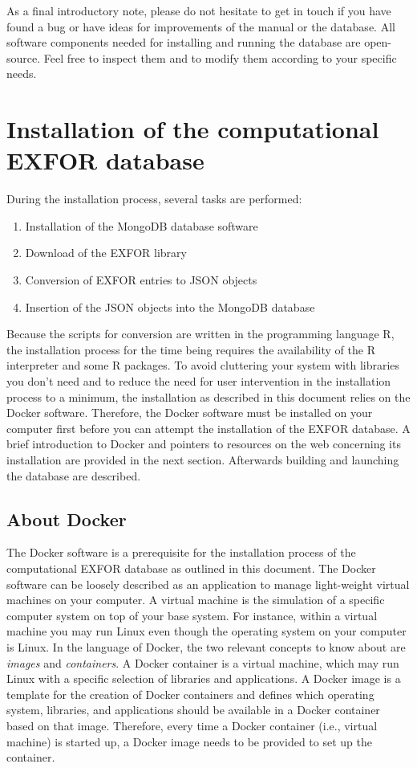 \documentclass[12pt,a4paper]{scrartcl}
\begin{document}
As a final introductory note, please do not hesitate to get in touch if you have found a bug or have ideas for improvements of the manual or the database.
All software components needed for installing and running the database are open-source.
Feel free to inspect them and to modify them according to your specific needs.

 \section{Installation of the computational EXFOR database}
 \label{sec:install_EXFOR}

 During the installation process, several tasks are performed:
\begin{enumerate}
 \item Installation of the MongoDB database software
 \item Download of the EXFOR library
 \item Conversion of EXFOR entries to JSON objects
 \item Insertion of the JSON objects into the MongoDB database 
\end{enumerate}
Because the scripts for conversion are written in the programming language R, the installation process for the time being requires the availability of the R interpreter and some R packages.
To avoid cluttering your system with libraries you don't need and to reduce the need for user intervention in the installation process to a minimum, the installation as described in this document relies on the Docker software.
Therefore, the Docker software must be installed on your computer first before you can attempt the installation of the EXFOR database.
A brief introduction to Docker and pointers to resources on the web concerning its installation are provided in the next section.
Afterwards building and launching the database are described.

 \subsection{About Docker}
 \label{subsec:about_docker}
 The Docker software is a prerequisite for the installation process of the computational EXFOR database as outlined in this document.
 The Docker software can be loosely described as an application to manage light-weight virtual machines on your computer.
 A virtual machine is the simulation of a specific computer system on top of your base system.
 For instance, within a virtual machine you may run Linux even though the operating system on your computer is Linux.
 In the language of Docker, the two relevant concepts to know about are \textit{images} and \textit{containers}.
 A Docker container is a virtual machine, which may run Linux with a specific selection of libraries and applications.
 A Docker image is a template for the creation of Docker containers and defines which operating system, libraries, and applications should be available in a Docker container based on that image.
 Therefore, every time a Docker container (i.e., virtual machine) is started up, a Docker image needs to be provided to set up the container.
\end{document}
